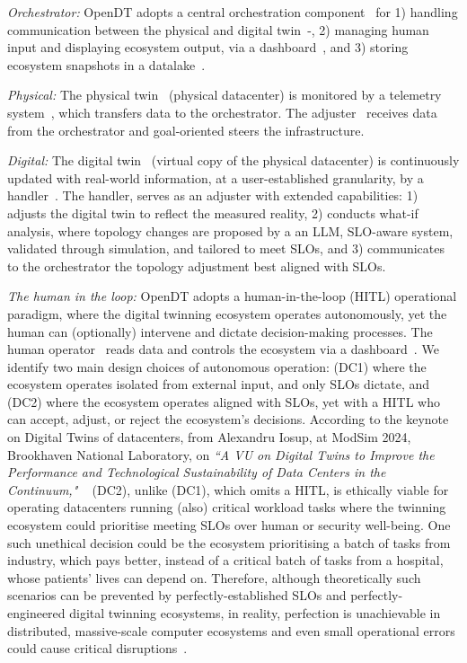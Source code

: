 \textit{Orchestrator:} OpenDT adopts a central orchestration component~ for 1) handling communication between the physical and digital twin~-, 2) managing human input and displaying ecosystem output, via a dashboard~, and 3) storing ecosystem snapshots in a datalake~.

\textit{Physical:} The physical twin~ (physical datacenter) is monitored by a telemetry system~, which transfers data to the orchestrator. The adjuster~ receives data from the orchestrator and goal-oriented steers the infrastructure.

\textit{Digital:} The digital twin~ (virtual copy of the physical datacenter) is continuously updated with real-world information, at a user-established granularity, by a handler~. The handler, serves as an adjuster with extended capabilities: 1) adjusts the digital twin to reflect the measured reality, 2) conducts what-if analysis, where topology changes are proposed by a an LLM, SLO-aware system, validated through simulation, and tailored to meet SLOs, and 3) communicates to the orchestrator the topology adjustment best aligned with SLOs.

\textit{The human in the loop:} OpenDT adopts a human-in-the-loop (HITL) operational paradigm, where the digital twinning ecosystem operates autonomously, yet the human can (optionally) intervene and dictate decision-making processes. The human operator~ reads data and controls the ecosystem via a dashboard~. We identify two main design choices of autonomous operation: (DC1) where the ecosystem operates isolated from external input, and only SLOs dictate, and (DC2) where the ecosystem operates aligned with SLOs, yet with a HITL who can accept, adjust, or reject the ecosystem's decisions. According to the keynote on Digital Twins of datacenters, from Alexandru Iosup, at ModSim 2024, Brookhaven National Laboratory, on \textit{``A VU on Digital Twins to Improve the Performance and Technological Sustainability of Data Centers in the
Continuum,"} ~\cite{ModSim2024Agenda} (DC2), unlike (DC1), which omits a HITL, is ethically viable for operating datacenters running (also) critical workload tasks where the twinning ecosystem could prioritise meeting SLOs over human or security well-being. One such unethical decision could be the ecosystem prioritising a batch of tasks from industry, which pays better, instead of a critical batch of tasks from a hospital, whose patients' lives can depend on. Therefore, although theoretically such scenarios can be prevented by perfectly-established SLOs and perfectly-engineered digital twinning ecosystems, in reality, perfection is unachievable in distributed, massive-scale computer ecosystems and even small operational errors could cause critical disruptions~\cite{Iosup2024DigitalTwins}.

